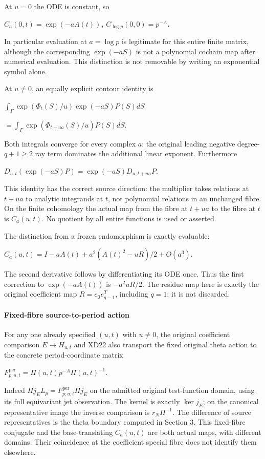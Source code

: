 At \(u=0\) the ODE is constant, so

\textbf{\(C_a(0,t)=\exp(-a A(t))\), \(C_{\log p}(0,0)=p^{-A}\).}

In particular evaluation at \(a=\log p\) is legitimate for this entire finite matrix, although the corresponding \(\exp(-aS)\) is not a polynomial cochain map after numerical evaluation. This distinction is not removable by writing an exponential symbol alone.

At \(u\ne 0\), an equally explicit contour identity is

\(\int_\Gamma \exp(\Phi_t(S)/u) \exp(-aS) P(S)dS\)

\(=\int_\Gamma \exp(\Phi_{t+ua}(S)/u) P(S)dS\).

Both integrals converge for every complex \(a\): the original leading negative degree-\(q+1\ge 2\) ray term dominates the additional linear exponent. Furthermore

\(D_{u,t}(\exp(-aS)P)=\exp(-aS)D_{u,t+ua}P\).

This identity has the correct source direction: the multiplier takes relations at \(t+ua\) to analytic integrands at \(t\), not polynomial relations in an unchanged fibre. On the finite cohomology the actual map from the fibre at \(t+ua\) to the fibre at \(t\) is \(C_a(u,t)\). No quotient by all entire functions is used or asserted.

The distinction from a frozen endomorphism is exactly evaluable:

\(C_a(u,t)=I-aA(t)+a^2(A(t)^2-uR)/2+O(a^3)\).

The second derivative follows by differentiating its ODE once. Thus the first correction to \(\exp(-aA(t))\) is \(-a^2uR/2\). The residue map here is exactly the original coefficient map \(R=e_0 e_{q-1}^T\), including \(q=1\); it is not discarded.

\paragraph{Fixed-fibre source-to-period action}\label{endpoint-f1_scaling--fixed-fibre-source-to-period-action}

For any one already specified \((u,t)\) with \(u\ne 0\), the original coefficient comparison \(E \to  H_{u,t}\) and XD22 also transport the fixed original theta action to the concrete period-coordinate matrix

\(F_{p;u,t}^{\mathrm{per}}=\Pi(u,t) p^{-A} \Pi(u,t)^{-1}\).

Indeed \(\Pi j_E L_p=F_{p;u,t}^{\mathrm{per}} \Pi j_E\) on the admitted original test-function domain, using its full equivariant jet observation. The kernel is exactly \(\ker j_E\); on the canonical representative image the inverse comparison is \(r_N \Pi^{-1}\). The difference of source representatives is the theta boundary computed in Section 3. This fixed-fibre conjugate and the base-translating \(C_a(u,t)\) are both actual maps, with different domains. Their coincidence at the coefficient special fibre does not identify them elsewhere.

